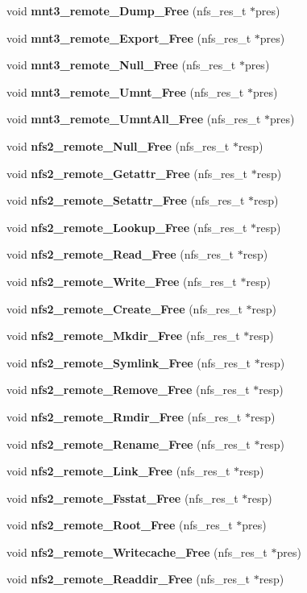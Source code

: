 \begin{DoxyCompactItemize}
\item 
void {\bf mnt3\_\-remote\_\-Dump\_\-Free} (nfs\_\-res\_\-t $\ast$pres)
\item 
void {\bf mnt3\_\-remote\_\-Export\_\-Free} (nfs\_\-res\_\-t $\ast$pres)
\item 
void {\bf mnt3\_\-remote\_\-Null\_\-Free} (nfs\_\-res\_\-t $\ast$pres)
\item 
void {\bf mnt3\_\-remote\_\-Umnt\_\-Free} (nfs\_\-res\_\-t $\ast$pres)
\item 
void {\bf mnt3\_\-remote\_\-UmntAll\_\-Free} (nfs\_\-res\_\-t $\ast$pres)
\item 
void {\bf nfs2\_\-remote\_\-Null\_\-Free} (nfs\_\-res\_\-t $\ast$resp)
\item 
void {\bf nfs2\_\-remote\_\-Getattr\_\-Free} (nfs\_\-res\_\-t $\ast$resp)
\item 
void {\bf nfs2\_\-remote\_\-Setattr\_\-Free} (nfs\_\-res\_\-t $\ast$resp)
\item 
void {\bf nfs2\_\-remote\_\-Lookup\_\-Free} (nfs\_\-res\_\-t $\ast$resp)
\item 
void {\bf nfs2\_\-remote\_\-Read\_\-Free} (nfs\_\-res\_\-t $\ast$resp)
\item 
void {\bf nfs2\_\-remote\_\-Write\_\-Free} (nfs\_\-res\_\-t $\ast$resp)
\item 
void {\bf nfs2\_\-remote\_\-Create\_\-Free} (nfs\_\-res\_\-t $\ast$resp)
\item 
void {\bf nfs2\_\-remote\_\-Mkdir\_\-Free} (nfs\_\-res\_\-t $\ast$resp)
\item 
void {\bf nfs2\_\-remote\_\-Symlink\_\-Free} (nfs\_\-res\_\-t $\ast$resp)
\item 
void {\bf nfs2\_\-remote\_\-Remove\_\-Free} (nfs\_\-res\_\-t $\ast$resp)
\item 
void {\bf nfs2\_\-remote\_\-Rmdir\_\-Free} (nfs\_\-res\_\-t $\ast$resp)
\item 
void {\bf nfs2\_\-remote\_\-Rename\_\-Free} (nfs\_\-res\_\-t $\ast$resp)
\item 
void {\bf nfs2\_\-remote\_\-Link\_\-Free} (nfs\_\-res\_\-t $\ast$resp)
\item 
void {\bf nfs2\_\-remote\_\-Fsstat\_\-Free} (nfs\_\-res\_\-t $\ast$resp)
\item 
void {\bf nfs2\_\-remote\_\-Root\_\-Free} (nfs\_\-res\_\-t $\ast$pres)
\item 
void {\bf nfs2\_\-remote\_\-Writecache\_\-Free} (nfs\_\-res\_\-t $\ast$pres)
\item 
void {\bf nfs2\_\-remote\_\-Readdir\_\-Free} (nfs\_\-res\_\-t $\ast$resp)

\end{DoxyCompactItemize}
